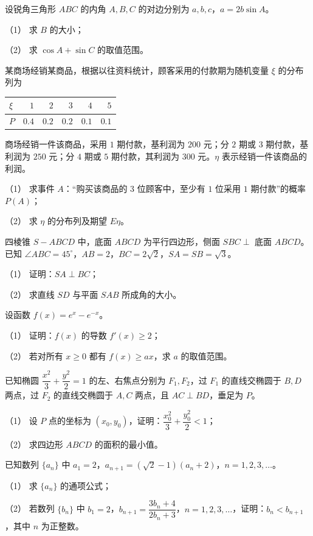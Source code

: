 \begin{question}
设锐角三角形 $ABC$ 的内角 $A,B,C$ 的对边分别为 $a,b,c$，$a=2b\sin A$。

（1） 求 $B$ 的大小；

（2） 求 $\cos A+\sin C$ 的取值范围。

\end{question}
\begin{question}
某商场经销某商品，根据以往资料统计，顾客采用的付款期为随机变量 $\xi$ 的分布列为

\begin{center}
\begin{tabular}{lrrrrr}
\toprule
$\xi$ & $1$ & $2$ & $3$ & $4$ & $5$ \\
\midrule
$P$ & $0.4$ & $0.2$ & $0.2$ & $0.1$ & $0.1$ \\
\bottomrule
\end{tabular}
\end{center}

商场经销一件该商品，采用 $1$ 期付款，基利润为 $200$ 元；分 $2$ 期或 $3$ 期付款，基利润为 $250$ 元；分 $4$ 期或 $5$ 期付款，其利润为 $300$ 元。$\eta$ 表示经销一件该商品的利润。

（1） 求事件 $A$：“购买该商品的 $3$ 位顾客中，至少有 $1$ 位采用 $1$ 期付款”的概率 $P(A)$；

（2） 求 $\eta$ 的分布列及期望 $E\eta$。

\Needspace{0.4\textheight}
\end{question}
\begin{question}
四棱锥 $S-ABCD$ 中，底面 $ABCD$ 为平行四边形，侧面 $SBC\perp$ 底面 $ABCD$。已知 $\angle ABC=45^\circ$，$AB=2$，$BC=2\sqrt2$，$SA=SB=\sqrt3$。
\nopagebreak[4]
\begin{center}\end{center}
\nopagebreak[4]
（1） 证明：$SA\perp BC$；

（2） 求直线 $SD$ 与平面 $SAB$ 所成角的大小。

\end{question}
\begin{question}
设函数 $f(x)=e^x-e^{-x}$。

（1） 证明：$f(x)$ 的导数 $f'(x)\geqslant2$；

（2） 若对所有 $x\geqslant0$ 都有 $f(x)\geqslant ax$，求 $a$ 的取值范围。

\end{question}
\begin{question}
已知椭圆 $\dfrac{x^2}{3}+\dfrac{y^2}{2}=1$ 的左、右焦点分别为 $F_1,F_2$，过 $F_1$ 的直线交椭圆于 $B,D$ 两点，过 $F_2$ 的直线交椭圆于 $A,C$ 两点，且 $AC\perp BD$，垂足为 $P$。

（1） 设 $P$ 点的坐标为 $(x_0,y_0)$，证明：$\dfrac{x_0^2}{3}+\dfrac{y_0^2}{2}<1$；

（2） 求四边形 $ABCD$ 的面积的最小值。

\end{question}
\begin{question}
已知数列 $\{a_n\}$ 中 $a_1=2$，$a_{n+1}=(\sqrt2-1)(a_n+2)$，$n=1,2,3,\ldots$。

（1） 求 $\{a_n\}$ 的通项公式；

（2） 若数列 $\{b_n\}$ 中 $b_1=2$，$b_{n+1}=\dfrac{3b_n+4}{2b_n+3}$，$n=1,2,3,\ldots$，证明：$b_n<b_{n+1}$，其中 $n$ 为正整数。

\end{question}